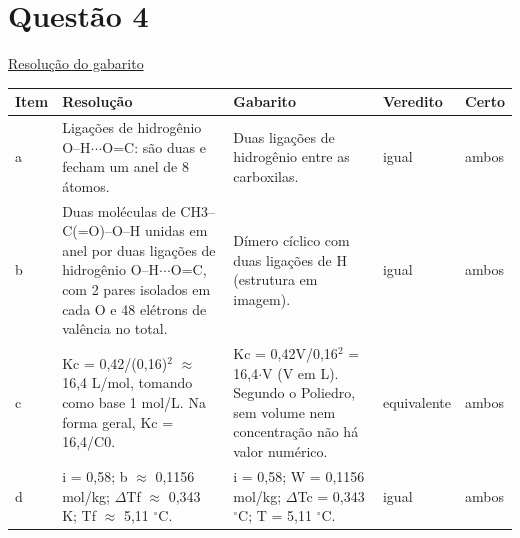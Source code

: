 \documentclass{article}%
\begin{document}
\section*{Questão 4}%
\href{https://poliedroresolve.sistemapoliedro.com.br/vestibulares/ime/2027/ime-2-fase-dia-3-28-10-2026-2-fase-dia-3/dissertativa-4-quimica-2-fase-dia-3-ime-2027}{Resolução do gabarito}\par\smallskip%
\begin{longtable}{@{}p{} p{} p{} p{} p{}@{}}\toprule Item & Resolução & Gabarito & Veredito & Certo \\ \midrule
a & Ligações de hidrogênio O--H$\cdot$$\cdot$$\cdot$O=C: são duas e fecham um anel de 8 átomos. & Duas ligações de hidrogênio entre as carboxilas. & igual & ambos \\
b & Duas moléculas de CH3--C(=O)--O--H unidas em anel por duas ligações de hidrogênio O--H$\cdot$$\cdot$$\cdot$O=C, com 2 pares isolados em cada O e 48 elétrons de valência no total. & Dímero cíclico com duas ligações de H (estrutura em imagem). & igual & ambos \\
c & Kc = 0,42/(0,16)$^2$ $\approx$ 16,4 L/mol, tomando como base 1 mol/L. Na forma geral, Kc = 16,4/C0. & Kc = 0,42V/0,16$^2$ = 16,4$\cdot$V (V em L). Segundo o Poliedro, sem volume nem concentração não há valor numérico. & equivalente & ambos \\
d & i = 0,58; b $\approx$ 0,1156 mol/kg; $\Delta$Tf $\approx$ 0,343 K; Tf $\approx$ 5,11 $^\circ$C. & i = 0,58; W = 0,1156 mol/kg; $\Delta$Tc = 0,343 $^\circ$C; T = 5,11 $^\circ$C. & igual & ambos \\
\bottomrule\end{longtable}%
\end{document}
